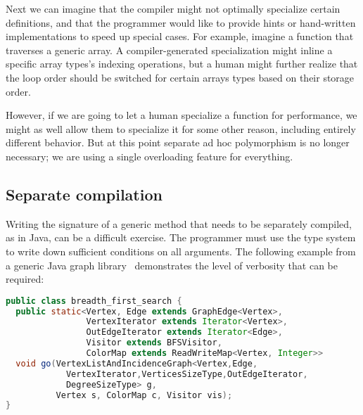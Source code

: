 Next we can imagine that the compiler might not optimally specialize
certain definitions, and that the programmer would like to provide
hints or hand-written implementations to speed up special cases.
For example, imagine a function that traverses a generic array.
A compiler-generated specialization might inline a specific array types's
indexing operations, but a human might further realize that the loop order
should be switched for certain arrays types based on their storage order.

However, if we are going to let a human specialize a function for performance,
we might as well allow them to specialize it for some other reason, including
entirely different behavior.
But at this point separate ad hoc polymorphism is no longer necessary; we are
using a single overloading feature for everything.

\iffalse
Parametric polymorphism describes code that works for any object precisely
because it does not do anything meaningful to the object, for example the
identity function. In contrast, programming with tagged data (e.g.
symbolic expression systems, XML) permits code to work for any object
because every object has the same structure, allowing meaningful
operations.
\fi

\subsection{Separate compilation}

Writing the signature of a generic method that needs to be separately compiled,
as in Java, can be a difficult exercise.
The programmer must use the type system to write down sufficient conditions on all
arguments.
The following example from a generic Java graph
library~\cite{Garcia:2003:CSL:949305.949317} demonstrates the level of verbosity
that can be required:

\begin{singlespace}
\begin{lstlisting}[language=java,style=ttcode]
public class breadth_first_search {
  public static<Vertex, Edge extends GraphEdge<Vertex>,
                VertexIterator extends Iterator<Vertex>,
                OutEdgeIterator extends Iterator<Edge>,
                Visitor extends BFSVisitor,
                ColorMap extends ReadWriteMap<Vertex, Integer>>
  void go(VertexListAndIncidenceGraph<Vertex,Edge,
            VertexIterator,VerticesSizeType,OutEdgeIterator,
            DegreeSizeType> g,
          Vertex s, ColorMap c, Visitor vis);
}
\end{lstlisting}
\end{singlespace}

